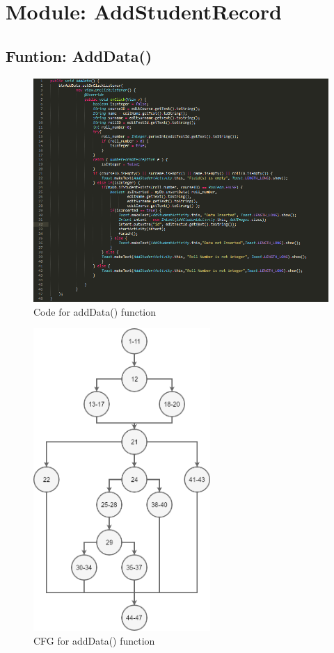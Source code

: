\documentclass{scrreprt}
\begin{document}
\section{Module: AddStudentRecord}
\subsection{Funtion: AddData()}
\begin{figure}[H]
\centering
\includegraphics[width=\textwidth, keepaspectratio]{addDataCode.png}
\caption{Code for addData() function}
\end{figure}

\begin{figure}[H]
\centering
\includegraphics[width=0.6\textwidth, keepaspectratio]{addData.png}
\caption{CFG for addData() function}
\end{figure}
\end{document}

